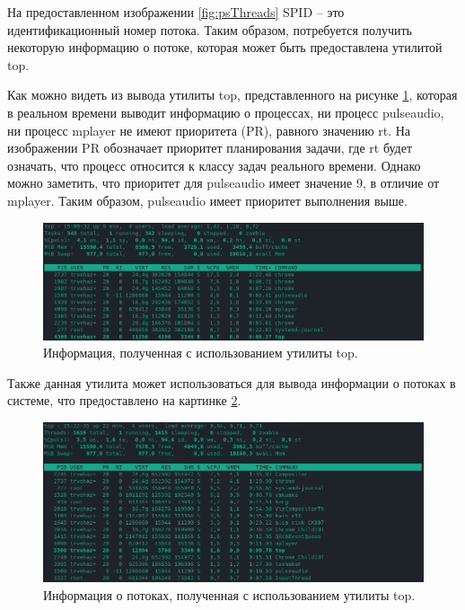 На предоставленном изображении \ref{fig:psThreads} SPID -- это идентификационный номер потока. Таким образом, потребуется получить некоторую информацию о потоке, которая может быть предоставлена утилитой top.

Как можно видеть из вывода утилиты top, представленного на рисунке \ref{fig:topMPlayer}, которая в реальном времени выводит информацию о процессах, ни процесс pulseaudio, ни процесс mplayer не имеют приоритета (PR), равного значению rt. На изображении PR обозначает приоритет планирования задачи, где rt будет означать, что процесс относится к классу задач реального времени. Однако можно заметить, что приоритет для pulseaudio имеет значение 9, в отличие от mplayer. Таким образом, pulseaudio имеет приоритет выполнения выше.

\begin{figure}[H]
	\centering
	\includegraphics[scale=0.65]{img/topMPlayer.png}
	\caption{Информация, полученная с использованием утилиты top. }
	\label{fig:topMPlayer}
\end{figure}

Также данная утилита может использоваться для вывода информации о потоках в системе, что предоставлено на картинке \ref{fig:topMPlayerThreads}.

\begin{figure}[H]
	\centering
	\includegraphics[scale=0.65]{img/topMPlayerThreads.png}
	\caption{Информация о потоках, полученная с использованием утилиты top. }
	\label{fig:topMPlayerThreads}
\end{figure}

